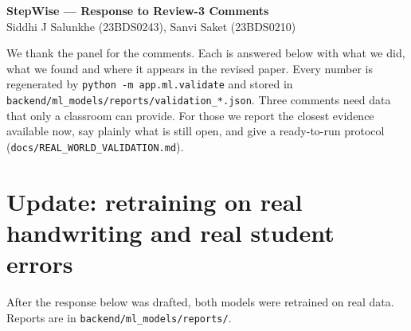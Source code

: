 \documentclass[10pt]{article}
\begin{document}
{\large\bfseries StepWise --- Response to Review-3 Comments}\\[2pt]
Siddhi J Salunkhe (23BDS0243), Sanvi Saket (23BDS0210)

We thank the panel for the comments. Each is answered below with what we did, what we found and
where it appears in the revised paper. Every number is regenerated by
\texttt{python -m app.ml.validate} and stored in \texttt{backend/ml\_models/reports/validation\_*.json}.
Three comments need data that only a classroom can provide. For those we report the closest
evidence available now, say plainly what is still open, and give a ready-to-run protocol
(\texttt{docs/REAL\_WORLD\_VALIDATION.md}).

\section*{Update: retraining on real handwriting and real student errors}
After the response below was drafted, both models were retrained on real data. Reports are in
\texttt{backend/ml\_models/reports/}.
\end{document}
